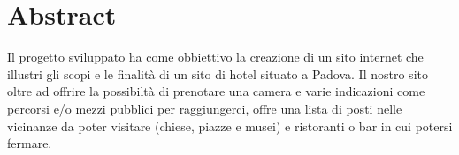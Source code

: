 \section{Abstract}
Il progetto sviluppato ha come obbiettivo la creazione di un sito internet che illustri gli scopi e le finalità di un sito di hotel situato a Padova.
Il nostro sito oltre ad offrire la possibiltà di prenotare una camera e varie indicazioni come percorsi e/o mezzi pubblici per raggiungerci, offre una lista
di posti nelle vicinanze da poter visitare (chiese, piazze e musei) e ristoranti o bar in cui potersi fermare.
